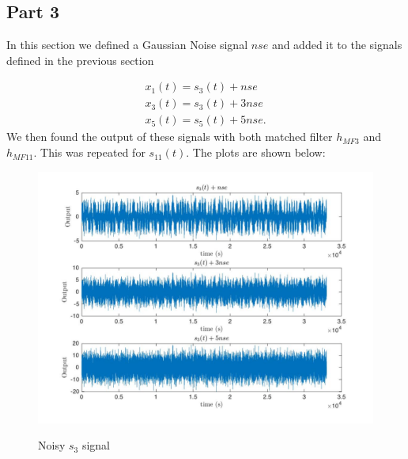 \documentclass{article}
\begin{document}
\subsection{Part 3}
In this section we defined a Gaussian Noise signal $nse$ and added it to the signals defined in the previous section

\begin{align*}
x_1(t) = s_3(t) + nse \\
x_3(t) = s_3(t) + 3nse \\ 
x_5(t) = s_5(t) + 5nse.
\end{align*}
We then found the output of these signals with both matched filter $h_{MF3}$ and $h_{MF11}$. This was repeated for $s_{11}(t)$. The plots are shown below:

\begin{figure}[!htb]
    \centering
    \begin{minipage}{.5\textwidth}
        \centering
        \includegraphics[width=1.0\linewidth, height=0.2\textheight]{s3noise.jpg}

        \label{fig:prob1_6_2}
    \end{minipage}
    \caption{Noisy $s_3$ signal}
\end{figure}
\end{document}
